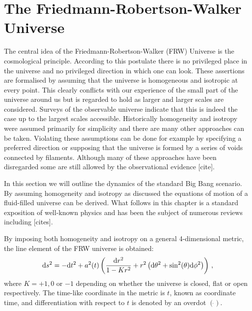 \section{The Friedmann-Robertson-Walker Universe}
\label{sec:frw-intro}
The central idea of the Friedmann-Robertson-Walker (FRW) Universe is the
cosmological principle\footnotemark. 
According to this postulate there is no privileged
place in the universe and no privileged direction in which one can look. These
assertions
are formalised by assuming that the universe is homogeneous and isotropic at
every point. This clearly conflicts with our experience of the small part of
the universe around us but is regarded to hold as larger and larger scales are
considered.
Surveys of the observable universe indicate that this is
indeed the case up to the largest scales accessible. 
Historically homogeneity and isotropy were assumed primarily for simplicity and
there are many other approaches can be taken. Violating these assumptions can
be done for example by specifying a preferred direction or supposing that the
universe is formed by a series of voids connected by filaments. Although many
of these approaches have been disregarded some are still
allowed by the observational evidence [cite].

In this section we will outline the dynamics of the standard Big Bang scenario.
By assuming homogeneity and isotropy as discussed the equations of motion of a
fluid-filled universe can be derived. What follows in this chapter is a
standard exposition of well-known physics and has been the subject of
numerous reviews including [cites].


By imposing both homogeneity and isotropy on a general 4-dimensional metric, the
line element of the FRW universe is obtained:
% 
\begin{equation}
 \label{eq:frwmetric-intro}
\mathrm{d} s^2 = -\mathrm{d} t^2 + a^2(t)
  \left( 
    \frac{\mathrm{d} r^2}{1-Kr^2} + r^2\left(\mathrm{d}\theta^2 + \sin^2(\theta) \mathrm{d}\phi^2\right)
  \right)\,,
\end{equation}
% 
where $K=+1, 0$ or $-1$ depending on whether the universe is closed, flat
or open respectively. The time-like coordinate in the metric is $t$, known as
coordinate time, and differentiation with respect to $t$ is denoted by an
overdot $(\dot{})$. 


